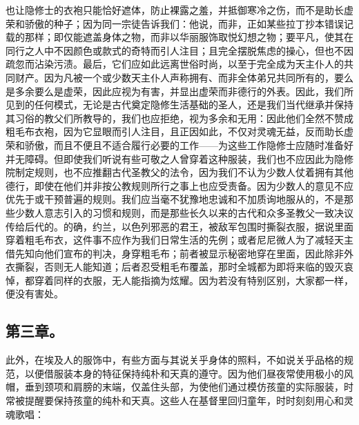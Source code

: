 也让隐修士的衣袍只能恰好遮体，防止裸露之羞，并抵御寒冷之伤，而不是助长虚荣和骄傲的种子；因为同一宗徒告诉我们：他说，而非，正如某些拉丁抄本错误记载的那样；即仅能遮盖身体之物，而非以华丽服饰取悦幻想之物；要平凡，使其在同行之人中不因颜色或款式的奇特而引人注目；且完全摆脱焦虑的操心，但也不因疏忽而沾染污渍。最后，它们应如此远离世俗时尚，以至于完全成为天主仆人的共同财产。因为凡被一个或少数天主仆人声称拥有、而非全体弟兄共同所有的，要么是多余要么是虚荣，因此应视为有害，并显出虚荣而非德行的外表。因此，我们所见到的任何模式，无论是古代奠定隐修生活基础的圣人，还是我们当代继承并保持其习俗的教父们所教导的，我们也应拒绝，视为多余和无用：因此他们全然不赞成粗毛布衣袍，因为它显眼而引人注目，且正因如此，不仅对灵魂无益，反而助长虚荣和骄傲，而且不便且不适合履行必要的工作——为这些工作隐修士应随时准备好并无障碍。但即使我们听说有些可敬之人曾穿着这种服装，我们也不应因此为隐修院制定规则，也不应推翻古代圣教父的法令，因为我们不认为少数人仗着拥有其他德行，即使在他们并非按公教规则所行之事上也应受责备。因为少数人的意见不应优先于或干预普遍的规则。我们应当毫不犹豫地忠诚和不加质询地服从的，不是那些少数人意志引入的习惯和规则，而是那些长久以来的古代和众多圣教父一致决议传给后代的。的确，约兰，以色列邪恶的君王，被敌军包围时撕裂衣服，据说里面穿着粗毛布衣，这件事不应作为我们日常生活的先例；或者尼尼微人为了减轻天主借先知向他们宣布的判决，身穿粗毛布；前者被显示秘密地穿在里面，因此除非外衣撕裂，否则无人能知道；后者忍受粗毛布覆盖，那时全城都为即将来临的毁灭哀悼，都穿着同样的衣服，无人能指摘为炫耀。因为若没有特别区别，大家都一样，便没有害处。\par


\subsection{第三章。}

\par

此外，在埃及人的服饰中，有些方面与其说关乎身体的照料，不如说关乎品格的规范，以便借服装本身的特征保持纯朴和天真的遵守。因为他们昼夜常使用极小的风帽，垂到颈项和肩膀的末端，仅盖住头部，为使他们通过模仿孩童的实际服装，时常被提醒要保持孩童的纯朴和天真。这些人在基督里回归童年，时时刻刻用心和灵魂歌唱：\par

